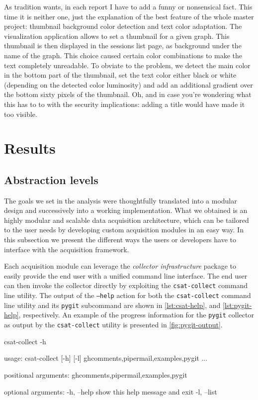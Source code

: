 As tradition wants, in each report I have to add a funny or nonsensical fact. This time it is neither one, just the explanation of the best feature of the whole master project: thumbnail background color detection and text color adaptation. The visualization application allows to set a thumbnail for a given graph. This thumbnail is then displayed in the sessions list page, as background under the name of the graph. This choice caused certain color combinations to make the text completely unreadable. To obviate to the problem, we detect the main color in the bottom part of the thumbnail, set the text color either black or white (depending on the detected color luminosity) and add an additional gradient over the bottom sixty pixels of the thumbnail. Oh, and in case you're wondering what this has to to with the security implications: adding a title would have made it too visible.

\section{Results}

\subsection{Abstraction levels}

The goals we set in the analysis were thoughtfully translated into a modular design and successively into a working implementation. What we obtained is an highly modular and scalable data acquisition architecture, which can be tailored to the user needs by developing custom acquisition modules in an easy way. In this subsection we present the different ways the users or developers have to interface with the acquisition framework.

Each acquisition module can leverage the \emph{collector infrastructure} package to easily provide the end user with a unified command line interface. The end user can then invoke the collector directly by exploiting the \texttt{csat-collect} command line utility. The output of the \texttt{--help} action for both the \texttt{csat-collect} command line utility and its \texttt{pygit} subcommand are shown in \vref{lst:csat-help}, and \vref{lst:pygit-help}, respectively. An example of the progress information for the \texttt{pygit} collector as output by the \texttt{csat-collect} utility is presented in \ref{fig:pygit-output}.

\begin{userprompt}[caption={General help for the \texttt{csat-collect} command line utility.},label=lst:csat-help]
csat-collect -h
\end{userprompt}
\begin{cmdresult}
usage: csat-collect [-h] [-l] {ghcomments,pipermail,examples,pygit} ...

positional arguments:
  {ghcomments,pipermail,examples,pygit}

optional arguments:
  -h, --help            show this help message and exit
  -l, --list
\end{cmdresult}

